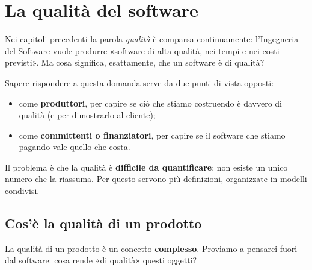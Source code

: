 \chapter{La qualità del software}

Nei capitoli precedenti la parola \textit{qualità} è comparsa continuamente: l'Ingegneria del Software vuole produrre
«software di alta qualità, nei tempi e nei costi previsti». Ma cosa significa, esattamente, che un software è di qualità?

Sapere rispondere a questa domanda serve da due punti di vista opposti:
\begin{itemize}
  \item come \textbf{produttori}, per capire se ciò che stiamo costruendo è davvero di qualità (e per dimostrarlo al cliente);
  \item come \textbf{committenti o finanziatori}, per capire se il software che stiamo pagando vale quello che costa.
\end{itemize}

Il problema è che la qualità è \textbf{difficile da quantificare}: non esiste un unico numero che la riassuma. Per questo servono
più definizioni, organizzate in modelli condivisi.

\section{Cos'è la qualità di un prodotto}

La qualità di un prodotto è un concetto \textbf{complesso}. Proviamo a pensarci fuori dal software: cosa rende «di qualità»
questi oggetti?

\begin{center}
\end{center}

